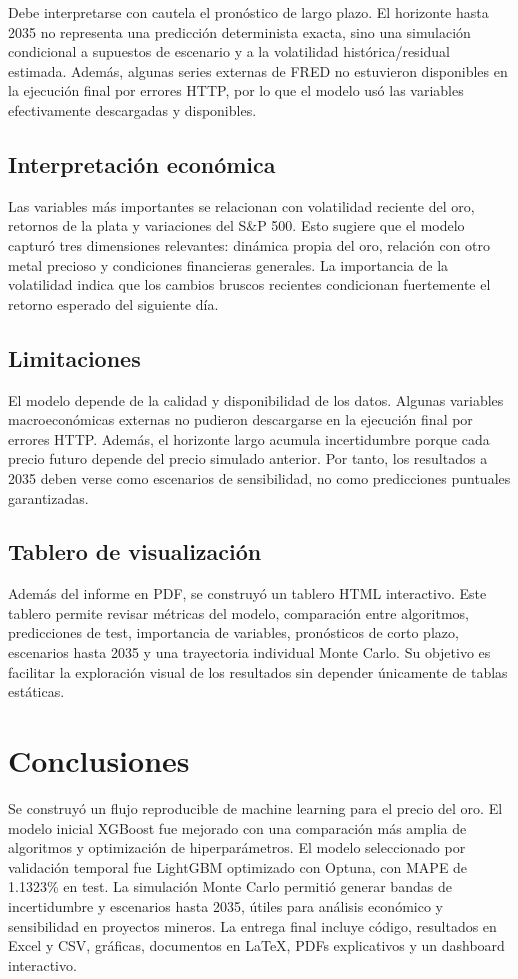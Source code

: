 \documentclass[12pt,letterpaper]{article}
\begin{document}
Debe interpretarse con cautela el pronóstico de largo plazo. El horizonte hasta 2035 no representa una predicción determinista exacta, sino una simulación condicional a supuestos de escenario y a la volatilidad histórica/residual estimada. Además, algunas series externas de FRED no estuvieron disponibles en la ejecución final por errores HTTP, por lo que el modelo usó las variables efectivamente descargadas y disponibles.

\subsection{Interpretación económica}
Las variables más importantes se relacionan con volatilidad reciente del oro, retornos de la plata y variaciones del S\&P 500. Esto sugiere que el modelo capturó tres dimensiones relevantes: dinámica propia del oro, relación con otro metal precioso y condiciones financieras generales. La importancia de la volatilidad indica que los cambios bruscos recientes condicionan fuertemente el retorno esperado del siguiente día.

\subsection{Limitaciones}
El modelo depende de la calidad y disponibilidad de los datos. Algunas variables macroeconómicas externas no pudieron descargarse en la ejecución final por errores HTTP. Además, el horizonte largo acumula incertidumbre porque cada precio futuro depende del precio simulado anterior. Por tanto, los resultados a 2035 deben verse como escenarios de sensibilidad, no como predicciones puntuales garantizadas.

\subsection{Tablero de visualización}
Además del informe en PDF, se construyó un tablero HTML interactivo. Este tablero permite revisar métricas del modelo, comparación entre algoritmos, predicciones de test, importancia de variables, pronósticos de corto plazo, escenarios hasta 2035 y una trayectoria individual Monte Carlo. Su objetivo es facilitar la exploración visual de los resultados sin depender únicamente de tablas estáticas.

\section{Conclusiones}
Se construyó un flujo reproducible de machine learning para el precio del oro. El modelo inicial XGBoost fue mejorado con una comparación más amplia de algoritmos y optimización de hiperparámetros. El modelo seleccionado por validación temporal fue LightGBM optimizado con Optuna, con MAPE de 1.1323\% en test. La simulación Monte Carlo permitió generar bandas de incertidumbre y escenarios hasta 2035, útiles para análisis económico y sensibilidad en proyectos mineros. La entrega final incluye código, resultados en Excel y CSV, gráficas, documentos en LaTeX, PDFs explicativos y un dashboard interactivo.
\end{document}
